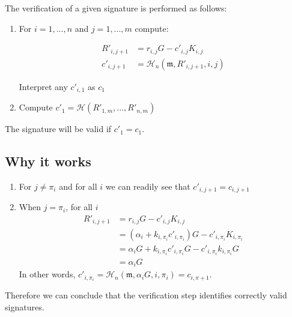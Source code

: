 The verification of a given signature is performed as follows:

\begin{enumerate}
	
	\item For \(i = 1, ..., n \) and \(j = 1, ..., m \) compute:
	

	\begin{align*}
	   R'_{i, j+1} &= r_{i, j} G - c'_{i, j} K_{i, j} \\
	   c'_{i, j+1} &= \mathcal{H}_n (\mathfrak{m}, R'_{i, j+1}, i, j) 
	\end{align*}
	
	Interpret any \(c'_{i, 1}\) as \(c_1\)
	
	\item Compute \(c'_1 = \mathcal{H}(R'_{1, m}, ..., R'_{n, m}) \)	
	
\end{enumerate}

The signature will be valid if \(c'_1 = c_1\).




\subsection*{Why it works}


\begin{enumerate}
	\item For \(j \ne \pi_i\) and for all \(i\) we can readily see that \(c'_{i, j+1} = c_{i, j+1}\)
	
	\item When \(j = \pi_i\), for all \(i \)
	\begin{align*}
	R'_{i, j+1} &= r_{i, j} G - c'_{i, j} K_{i, j} \\
	            &= (\alpha_i + k_{i, \pi_i} c'_{i, \pi_{i}}) G - c'_{i, \pi_i} K_{i, \pi_i} \\
	            &= \alpha_i G + k_{i, \pi_i} c'_{i, \pi_{i}} G - c'_{i, \pi_i} k_{i, \pi_i} G \\
	            &= \alpha_i G 
	\end{align*}
	In other words, \(c'_{i, \pi_i} = \mathcal{H}_n(\mathfrak{m}, \alpha_i G, i, \pi_i) = c_{i, \pi+1}\).
	
\end{enumerate}

Therefore we can conclude that the verification step identifies correctly valid signatures.














 



